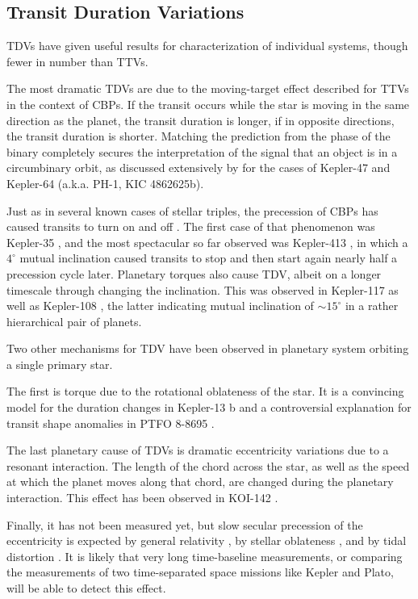 \documentclass[graybox,natbib,nosecnum]{svmult}
\begin{document}
\subsection{Transit Duration Variations}

TDVs have given useful results for characterization of individual systems, though fewer in number than TTVs.

The most dramatic TDVs are due to the moving-target effect described for TTVs in the context of CBPs.  If the transit occurs while the star is moving in the same direction as the planet, the transit duration is longer, if in opposite directions, the transit duration is shorter.  Matching the prediction from the phase of the binary completely secures the interpretation of the signal that an object is in a circumbinary orbit, as discussed extensively by \cite{2013ApJ...770...52K} for the cases of Kepler-47 and Kepler-64 (a.k.a. PH-1, KIC 4862625b).

Just as in several known cases of stellar triples, the precession of CBPs has caused transits to turn on and off \citep{2017MNRAS.465.3235M}.  The first case of that phenomenon was Kepler-35 \citep{2012Natur.481..475W}, and the most spectacular so far observed was Kepler-413 \citep{2014ApJ...784...14K}, in which a $4^\circ$ mutual inclination caused transits to stop and then start again nearly half a precession cycle later.  Planetary torques also cause TDV, albeit on a longer timescale through changing the inclination.  This was observed in Kepler-117 \citep{2015MNRAS.453.2644A} as well as Kepler-108 \citep{1538-3881-153-1-45}, the latter indicating mutual inclination of $\sim 15^\circ$ in a rather hierarchical pair of planets. 

Two other mechanisms for TDV have been observed in planetary system orbiting a single primary star.

The first is torque due to the rotational oblateness of the star.  It is a convincing model for the duration changes in Kepler-13 b \citep[KOI 13.01][]{Szab2012} and a controversial explanation for transit shape anomalies in PTFO 8-8695 \citep{2013ApJ...774...53B}. 

The last planetary cause of TDVs is dramatic eccentricity variations due to a resonant interaction.  The length of the chord across the star, as well as the speed at which the planet moves along that chord, are changed during the planetary interaction.  This effect has been observed in KOI-142 \citep{2013ApJ...777....3N}.

Finally, it has not been measured yet, but slow secular precession of the eccentricity is expected by general relativity \citep{2008MNRAS.389..191P}, by stellar oblateness \citep{2007MNRAS.377.1511H}, and by tidal distortion \citep{2009ApJ...698.1778R}.  It is likely that very long time-baseline measurements, or comparing the measurements of two time-separated space missions like Kepler and Plato, will be able to detect this effect.
\end{document}
